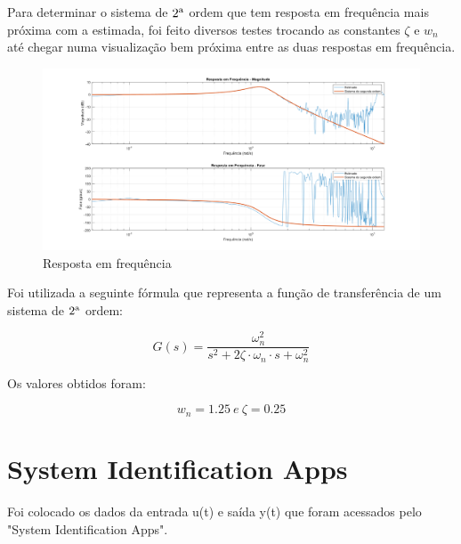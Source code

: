 \documentclass[10pt]{article}
\begin{document}
\quad Para determinar o sistema de $2\textsuperscript{a}$ ordem que tem resposta em frequência mais próxima com a estimada,
foi feito diversos testes trocando as constantes $\zeta$ e $w_n$ até chegar numa visualização bem próxima entre as duas respostas em frequência.

\begin{figure}[h]
    \centering
    \includegraphics[scale=0.35]{g_manual.png}
    \caption{Resposta em frequência}
\end{figure}

\quad Foi utilizada a seguinte fórmula que representa a função de transferência de um sistema de $2\textsuperscript{a}$ ordem:

\begin{equation}
    G(s) = \frac{\omega_n^2}{s^2 + 2 \zeta \cdot \omega_n \cdot s + \omega_n^2}
\end{equation}

\quad Os valores obtidos foram:

\begin{equation}
    w_n = 1.25 \ e \ \zeta = 0.25
\end{equation}

\newpage

\section{System Identification Apps}

\quad Foi colocado os dados da entrada u(t) e saída y(t) que foram acessados pelo "System Identification Apps".
\end{document}
